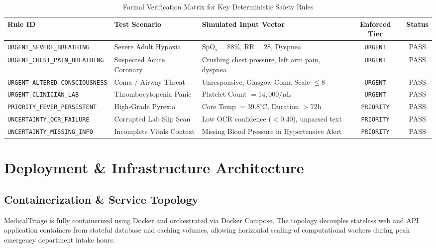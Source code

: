 \documentclass[11pt,a4paper,oneside]{report}
\begin{document}
\begin{table}[htbp]
  \centering
  \small
  \caption{Formal Verification Matrix for Key Deterministic Safety Rules}
  \label{tab:verification_matrix}
  \begin{tabularx}{\textwidth}{lp{3.4cm}p{3.8cm}cc}
    \toprule
    \textbf{Rule ID} & \textbf{Test Scenario} & \textbf{Simulated Input Vector} & \textbf{Enforced Tier} & \textbf{Status} \\
    \midrule
    \texttt{URGENT\_SEVERE\_BREATHING} & Severe Adult Hypoxia & $\text{SpO}_2 = 88\%$, $\text{RR} = 28$, Dyspnea & \texttt{URGENT} & PASS \\
    \texttt{URGENT\_CHEST\_PAIN\_BREATHING} & Suspected Acute Coronary & Crushing chest pressure, left arm pain, dyspnea & \texttt{URGENT} & PASS \\
    \texttt{URGENT\_ALTERED\_CONSCIOUSNESS} & Coma / Airway Threat & Unresponsive, Glasgow Coma Scale $\le 8$ & \texttt{URGENT} & PASS \\
    \texttt{URGENT\_CLINICIAN\_LAB} & Thrombocytopenia Panic & Platelet Count $= 14,000/\mu\text{L}$ & \texttt{URGENT} & PASS \\
    \texttt{PRIORITY\_FEVER\_PERSISTENT} & High-Grade Pyrexia & Core Temp $= 39.8^\circ\text{C}$, Duration $> 72\text{h}$ & \texttt{PRIORITY} & PASS \\
    \texttt{UNCERTAINTY\_OCR\_FAILURE} & Corrupted Lab Slip Scan & Low OCR confidence ($< 0.40$), unparsed text & \texttt{PRIORITY} & PASS \\
    \texttt{UNCERTAINTY\_MISSING\_INFO} & Incomplete Vitals Context & Missing Blood Pressure in Hypertensive Alert & \texttt{PRIORITY} & PASS \\
    \bottomrule
  \end{tabularx}
\end{table}

\chapter{Deployment \& Infrastructure Architecture}

\section{Containerization \& Service Topology}
MedicalTriage is fully containerized using Docker and orchestrated via Docker Compose. The topology decouples stateless web and API application containers from stateful database and caching volumes, allowing horizontal scaling of computational workers during peak emergency department intake hours.
\end{document}
